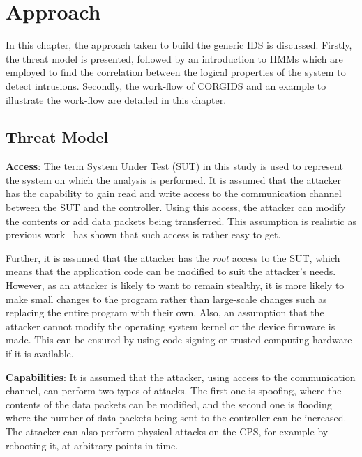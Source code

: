 
\chapter{\textbf{Approach}}
\label{sec3:Approach}

In this chapter, the approach taken to build the generic IDS is discussed.
Firstly, the threat model is presented, followed by an introduction to HMMs which are employed to find the correlation between the logical properties of the system to detect intrusions. Secondly, the work-flow of CORGIDS and an example to illustrate the work-flow are detailed in this chapter. 

\section{Threat Model}
\label{sec:threatModel}
{\bf Access}: The term System Under Test (SUT) in this study is used to represent the system on which the analysis is performed. It is assumed that the attacker has the capability to gain read and write access to the communication channel between the SUT and the controller. Using this access, the attacker can modify the contents or add data packets being transferred. This assumption is realistic as previous work~\cite{ericsson2010cyber} has shown that such access is rather easy to get.

Further, it is assumed that the attacker has the \textit{root} access to the SUT, which means that the application code can be modified to suit the attacker's needs. However, as an attacker is likely to want to remain stealthy, it is more likely to make small changes to the program rather than large-scale changes such as replacing the entire program with their own. Also, an assumption that the attacker cannot modify the operating system kernel or the device firmware is made. This can be ensured by using code signing or trusted computing hardware if it is available. 

{\bf Capabilities}: It is assumed that the attacker, using access to the communication channel, can perform two types of attacks. The first one is spoofing, where the contents of the data packets can be modified, and the second one is flooding where the number of data packets being sent to the controller can be increased. The attacker can also perform physical attacks on the CPS, for example by rebooting it, at arbitrary points in time. 
 
